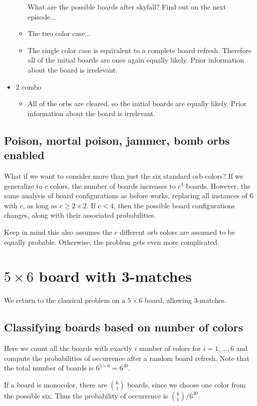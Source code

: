 \documentclass[12pt]{article}
\theoremstyle{definition}
\begin{document}
\begin{itemize}
\begin{itemize}
        What are the possible boards after skyfall? Find out on the next episode...
        \item 
        The two color case...
        \item The single color case is equivalent to a complete board refresh. Therefore all of the initial boards are once again equally likely. Prior information about the board is irrelevant.
    \end{itemize}
    \item 2 combo
    \begin{itemize}
        \item All of the orbs are cleared, so the initial boards are equally likely. Prior information about the board is irrelevant.
    \end{itemize}
\end{itemize}
\subsection{Poison, mortal poison, jammer, bomb orbs enabled}
What if we want to consider more than just the six standard orb colors? If we generalize to $c$ colors, the number of boards increases to $c^4$ boards. However, the same analysis of board configurations as before works, replacing all instances of 6 with $c$, as long as $c\geq 2\times 2$. If $c<4$, then the possible board configurations changes, along with their associated probabilities.

Keep in mind this also assumes the $c$ different orb colors are assumed to be equally probable. Otherwise, the problem gets even more complicated.


\section{$5\times 6$ board with 3-matches}
We return to the classical problem on a $5\times 6$ board, allowing 3-matches.

\subsection{Classifying boards based on number of colors}

Here we count all the boards with exactly $i$ number of colors for $i=1,\dots,6$ and compute the probabilities of occurrence after a random board refresh. Note that the total number of boards is $6^{5\times 6}=6^{30}$.

If a board is monocolor, there are $\binom{6}{1}$ boards, since we choose one color from the possible six. Thus the probability of occurrence is $\binom{6}{1}/6^{30}$.
\end{document}
